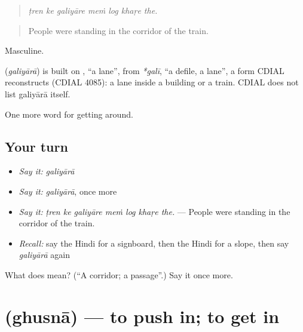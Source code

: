 \begin{quote}
      
\end{quote}

\begin{quote}
\emph{ṭren ke galiyāre meṁ log khaṛe the.}
\end{quote}

\begin{quote}
People were standing in the corridor of the train.
\end{quote}

Masculine.

\begin{cousinweb}
\textbf{} (\emph{galiyārā}) is built on , \textquotedblleft{}a lane\textquotedblright{}, from \emph{*galī}, \textquotedblleft{}a defile, a lane\textquotedblright{}, a form CDIAL reconstructs (CDIAL 4085): a lane inside a building or a train. CDIAL does not list galiyārā itself.
\end{cousinweb}

\begin{grammarlens}[title={What you've built}]
One more word for getting around.
\end{grammarlens}

\subsection*{Your turn}
\begin{itemize}
\raggedright
  \item \emph{Say it:} \emph{galiyārā}
  \item \emph{Say it:} \emph{galiyārā}, once more
  \item \emph{Say it:} \emph{ṭren ke galiyāre meṁ log khaṛe the.} — People were standing in the corridor of the train.
  \item \emph{Recall:} say the Hindi for a signboard, then the Hindi for a slope, then say \emph{galiyārā} again
\end{itemize}

\begin{tcolorbox}[breakable,colback=teal!4,colframe=teal!35!black,title={Before you move on}]
What does  mean? (\textquotedblleft{}A corridor; a passage\textquotedblright{}.) Say it once more.
\end{tcolorbox}
\section[\texorpdfstring{\hi{घुसना} (ghusnā)}{घुसना (ghusnā)}]{ (ghusnā) — to push in; to get in}

